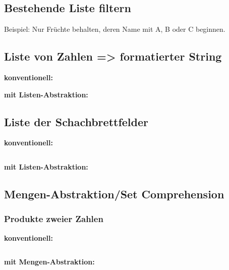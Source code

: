 \subsection{Bestehende Liste filtern}
Beispiel: Nur Früchte behalten, deren Name mit A, B oder C beginnen.


\subsection{Liste von Zahlen => formatierter String}

\textbf{konventionell:}

\textbf{mit Listen-Abstraktion:}


\subsection{Liste der Schachbrettfelder}
\begin{minipage}[t]{0.39\textwidth}
	\textbf{konventionell:}
	
\end{minipage}
\begin{minipage}[t]{0.02\textwidth} $ \quad $\end{minipage}
\begin{minipage}[t]{0.59\textwidth}
	\textbf{mit Listen-Abstraktion:}
	
\end{minipage}


\subsection{Mengen-Abstraktion/Set Comprehension}

\subsubsection{Produkte zweier Zahlen}
\begin{minipage}[t]{0.39\textwidth}
	\textbf{konventionell:}
	
\end{minipage}
\begin{minipage}[t]{0.02\textwidth} $ \quad $\end{minipage}
\begin{minipage}[t]{0.59\textwidth}
	\textbf{mit Mengen-Abstraktion:}
	
\end{minipage}



